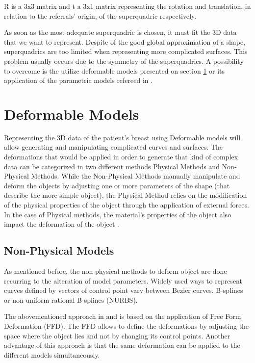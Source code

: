 R is a 3x3 matrix and t a 3x1 matrix representing the rotation and translation, in relation to the referrals' origin, of the superquadric respectively.

As soon as the most adequate superquadric is chosen, it must fit the 3D data that we want to represent. Despite of the good global approximation of a shape, superquadrics are too limited when representing more complicated surfaces. This problem usually occurs due to the symmetry of the superquadrics. A possibility to overcome is the utilize deformable models presented on section \ref{sec:deform} or its application of the parametric models refereed in \cite{Pernes2014}.



\section{Deformable Models}\label{sec:deform}
Representing the 3D data of the patient's breast using Deformable models will allow generating and manipulating complicated curves and surfaces. The deformations that would be applied in order to generate that kind of complex data can be categorized in two different methods Physical Methods and Non-Physical Methods. While the Non-Physical Methods manually manipulate and deform the objects by adjusting one or more parameters of the shape (that describe the more simple object), the Physical Method relies on the modification of the physical properties of the object through the application of external forces. In the case of Physical methods, the material's properties of the object also impact the deformation of the object \cite{Gibson97asurvey, De2016}.


\subsection{Non-Physical Models}

As mentioned before, the non-physical methods to deform object are done recurring to the alteration of model parameters. Widely used ways to represent curves defined by vectors of control point vary between Bezier curves, B-splines or non-uniform rational B-splines (NURBS).

The abovementioned approach in \cite{Pernes2014} and \cite{Vision1998} is based on the application of Free Form Deformation (FFD). The FFD allows to define the deformations by adjusting the space where the object lies and not by changing its control points. Another advantage of this approach is that the same deformation can be applied to the different models simultaneously.

